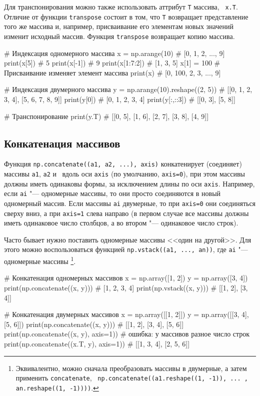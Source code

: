 Для транспонирования можно также использовать аттрибут \verb"T" массива, \te\ \verb"x.T".
Отличие от функции \verb"transpose" состоит в том, что \verb"T" возвращает представление того же массива и, например, присваивание его элементам новых значений изменит исходный массив.
Функция \verb"transpose" возвращает копию массива.

\begin{python}
# Индексация одномерного массива
x = np.arange(10)                     # [0, 1, 2, ..., 9]
print(x[5])                           # 5
print(x[-1])                          # 9
print(x[1:7:2])                       # [1, 3, 5]
x[1] = 100                            # Присваивание изменяет элемент массива
print(x)                              # [0, 100, 2, 3, ..., 9]

# Индексация двумерного массива
y = np.arange(10).reshape((2, 5))     # [[0, 1, 2, 3, 4], [5, 6, 7, 8, 9]]
print(y[0])                           # [0, 1, 2, 3, 4]
print(y[:,::3])                       # [[0, 3], [5, 8]] 

# Транспонирование
print(y.T)                            # [[0, 5], [1, 6], [2, 7], [3, 8], [4, 9]]
\end{python}


\subsection{Конкатенация массивов}
Функция \verb"np.concatenate((a1, a2, ...), axis)" конкатенирует (соединяет) массивы \verb"a1", \verb"a2" и \td\ вдоль оси \verb"axis" (по умолчанию, \verb"axis=0"), при этом массивы должны иметь одинаковы формы, за исключением длины по оси \verb"axis".
Например, если \verb"ai" "--- одномерные массивы, то они просто соединяются в новый одномерный массив.
Если массивы \verb"ai" двумерные, то при \verb"axis=0" они соединяться сверху вниз, а при \verb"axis=1" слева направо (в первом случае все массивы должны иметь одинаковое число столбцов, а во втором "--- одинаковое число строк).

Часто бывает нужно поставить одномерные массивы <<один на другой>>.
Для этого можно воспользоваться функцией \verb"np.vstack((a1, ..., an))", где \verb"ai" "--- одномерные массивы%
\footnote{Эквивалентно, можно сначала преобразовать массивы в двумерные, а затем применить \verb"concatenate", \te\ \verb"np.concatenate((a1.reshape((1, -1)), ... , an.reshape((1, -1))))".}.

\begin{python}
# Конкатенация одномерных массивов
x = np.array([1, 2])
y = np.array([3, 4])
print(np.concatenate((x, y)))  # [1, 2, 3, 4]
print(np.vstack((x, y)))       # [[1, 2], [3, 4]]

# Конкатенация двумерных массивов
x = np.array([[1, 2]])
y = np.array([[3, 4], [5, 6]])
print(np.concatenate((x, y)))            # [[1, 2], [3, 4], [5, 6]]
print(np.concatenate((x, y), axis=1))    # ошибка: у массивов разное число строк
print(np.concatenate((x.T, y), axis=1))  # [[1, 3, 4], [2, 5, 6]]
\end{python}


